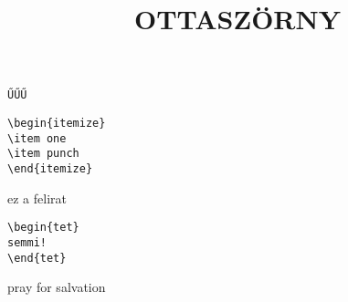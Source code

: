\documentclass{article}
\title{OTTASZÖRNY}
\newtheorem{tet}{DEAD}
\begin{document}
\maketitle
{}
\verb|ŰŰ|\hulipsum[1]\verb|Ű|
\begin{forras}
\begin{verbatim}
\begin{itemize}
\item one
\item punch
\end{itemize}
\end{verbatim}
\caption{ez a felirat}
\end{forras}
\hulipsum[1]
\begin{forras}
\begin{verbatim}
\begin{tet}
semmi!
\end{tet}
\end{verbatim}
\caption{pray for salvation}
\end{forras}
\end{document}
